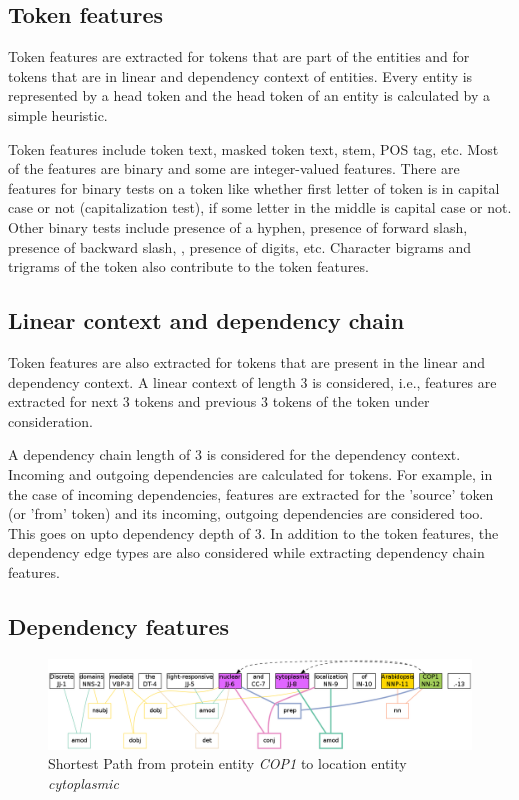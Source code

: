 \subsection*{Token features}

Token features are extracted for tokens that are part of the entities and for tokens that are in linear and dependency context of entities. Every entity is represented by a head token and the head token of an entity is calculated by a simple heuristic.

Token features include token text, masked token text, stem, POS tag, etc. Most of the features are binary and some are integer-valued features. There are features for binary tests on a token like whether first letter of token is in capital case or not (capitalization test), if some letter in the middle is capital case or not. Other binary tests include presence of a hyphen, presence of forward slash, presence of backward slash, , presence of digits, etc. Character bigrams and trigrams of the token also contribute to the token features.

\subsection*{Linear context and dependency chain}

Token features are also extracted for tokens that are present in the linear and dependency context. A linear context of length 3 is considered, i.e., features are extracted for next 3 tokens and previous 3 tokens of the token under consideration.

A dependency chain length of 3 is considered for the dependency context. Incoming and outgoing dependencies are calculated for tokens. For example, in the case of incoming dependencies, features are extracted for the 'source' token (or 'from' token) and its incoming, outgoing dependencies are considered too. This goes on upto dependency depth of 3. In addition to the token features, the dependency edge types are also considered while extracting dependency chain features.

\subsection*{Dependency features}

\begin{figure}
\centering
\includegraphics[scale=0.3]{figures/ShortestPath.png}
\caption{Shortest Path from protein entity \textit{COP1} to location entity \textit{cytoplasmic}}\label{fig:shortPath}
\end{figure}

